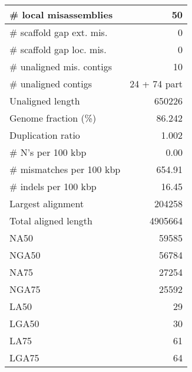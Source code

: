 \documentclass[12pt,a4paper]{article}
\begin{document}
\begin{table}[ht]
\begin{center}
\begin{tabular}{|l*{1}{|r}|}
\# local misassemblies & 50 \\ \hline
\# scaffold gap ext. mis. & 0 \\ \hline
\# scaffold gap loc. mis. & 0 \\ \hline
\# unaligned mis. contigs & 10 \\ \hline
\# unaligned contigs & 24 + 74 part \\ \hline
Unaligned length & 650226 \\ \hline
Genome fraction (\%) & 86.242 \\ \hline
Duplication ratio & 1.002 \\ \hline
\# N's per 100 kbp & 0.00 \\ \hline
\# mismatches per 100 kbp & 654.91 \\ \hline
\# indels per 100 kbp & 16.45 \\ \hline
Largest alignment & 204258 \\ \hline
Total aligned length & 4905664 \\ \hline
NA50 & 59585 \\ \hline
NGA50 & 56784 \\ \hline
NA75 & 27254 \\ \hline
NGA75 & 25592 \\ \hline
LA50 & 29 \\ \hline
LGA50 & 30 \\ \hline
LA75 & 61 \\ \hline
LGA75 & 64 \\ \hline
\end{tabular}
\end{center}
\end{table}
\end{document}
